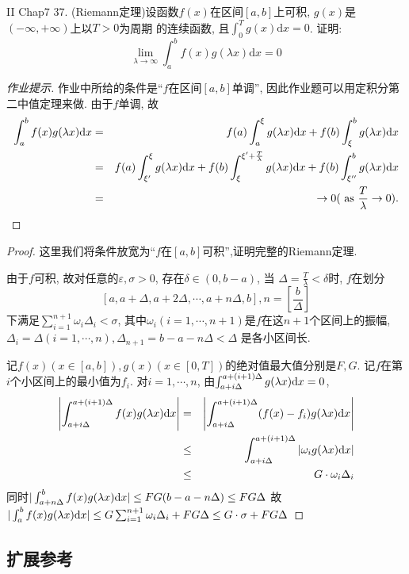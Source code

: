 \documentclass[a4paper,12pt]{article}
\begin{document}
\noindent II Chap7 37. (Riemann定理)设函数$f(x)$在区间$[a,b]$上可积, $g(x)$是$(-\infty,+\infty)$上以$T>0$为周期
的连续函数, 且$\int_0^Tg(x)\mathrm{d}x=0$. 证明:
\[
\lim_{\lambda\to\infty}\int_a^bf(x)g(\lambda x)\mathrm{d}x=0
\]
\begin{proof}[作业提示]
  作业中所给的条件是``$f$在区间$[a,b]$单调'', 
  因此作业题可以用定积分第二中值定理来做.
  由于$f$单调, 故
  \begin{eqnarray*}
    \int_a^bf(x)g(\lambda x)\mathrm{d} x&=&f(a)\int_a^\xi g(\lambda x)\mathrm{d} x+f(b)\int_\xi^b g(\lambda x)\mathrm{d} x\\
    &=&f(a)\int_{\xi'}^\xi g(\lambda x)\mathrm{d} x+f(b)\int_{\xi}^{\xi'+\frac{T}{\lambda}}g(\lambda x)\mathrm{d} x+f(b)\int_{\xi''}^bg(\lambda x)\mathrm{d} x\\
    &=&\to0 (\text{ as } \frac{T}{\lambda}\to0).
  \end{eqnarray*}
\end{proof}
\begin{proof}
  这里我们将条件放宽为``$f$在$[a,b]$可积'',证明完整的Riemann定理.

  由于$f$可积, 故对任意的$\varepsilon,\sigma>0$, 存在$\delta\in(0,b-a)$, 当
  $\Delta=\frac{T}{\lambda}<\delta$时, $f$在划分
  \[[a,a+\Delta,a+2\Delta,\cdots,a+n\Delta,b],n=[\frac{b}{\Delta}]\]
  下满足$\sum_{i=1}^{n+1}\omega_i\Delta_i<\sigma$, 
  其中$\omega_i(i=1,\cdots,n+1)$是$f$在这$n+1$个区间上的振幅, 
  $\Delta_i=\Delta(i=1,\cdots,n),\Delta_{n+1}=b-a-n\Delta<\Delta$
  是各小区间长.
  
  记$f(x)(x\in[a,b]),g(x)(x\in[0,T])$的绝对值最大值分别是$F,G$.
  记$f$在第$i$个小区间上的最小值为$f_i$.
  对$i=1,\cdots,n$, 由$\int_{a+i\Delta}^{a+(i+1)\Delta}g(\lambda x)\mathrm{d} x=0$, 
  \begin{eqnarray*}
    \left\vert\int_{a+i\Delta}^{a+(i+1)\Delta}f(x)g(\lambda x)\mathrm{d} x\right\vert&=&\left|\int_{a+i\Delta}^{a+(i+1)\Delta}(f(x)-f_i)g(\lambda x)\mathrm{d} x\right|\\
    &\leq&\int_{a+i\Delta}^{a+(i+1)\Delta}|\omega_ig(\lambda x)\mathrm{d} x|\\
    &\leq&G\cdot\omega_i\Delta_i
  \end{eqnarray*}
  同时$|\int_{a+n\Delta}^{b}f(x)g(\lambda x)\mathrm{d} x|\leq FG(b-a-n\Delta)\leq FG\Delta$
  故$|\int_a^bf(x)g(\lambda x)\mathrm{d} x|\leq G\sum_{i=1}^{n+1}\omega_i\Delta_i+FG\Delta\leq G\cdot\sigma+FG\Delta$
\end{proof}

\subsection*{扩展参考}
\end{document}
